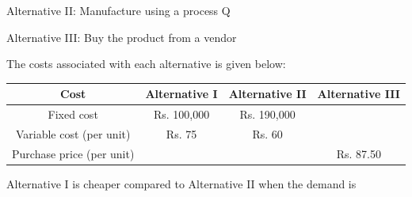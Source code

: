 \documentclass[journal,12pt,onecolumn]{IEEEtran}
\theoremstyle{remark}
\begin{document}
\begin{enumerate}
Alternative II: Manufacture using a process Q

Alternative III: Buy the product from a vendor

The costs associated with each alternative is given below:

\begin{center}
\begin{tabular}{|c|c|c|c|}
\hline
\textbf{Cost} & \textbf{Alternative I} & \textbf{Alternative II} & \textbf{Alternative III} \\
\hline
Fixed cost & Rs. 100,000 & Rs. 190,000 & \\
Variable cost (per unit) & Rs. 75 & Rs. 60 & \\
Purchase price (per unit) &  &  & Rs. 87.50 \\
\hline
\end{tabular}
\end{center}

Alternative I is cheaper compared to Alternative II when the demand is


\end{enumerate}
\end{document}
